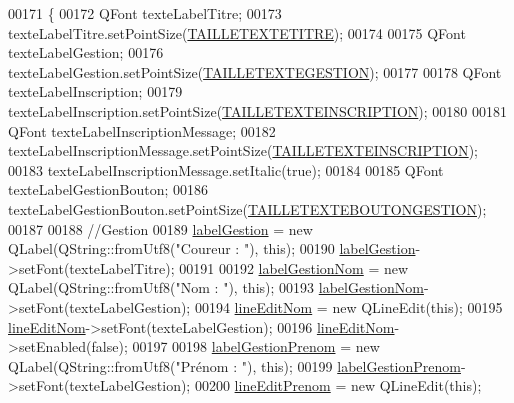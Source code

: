 \begin{DoxyCode}
00171 \{
00172     QFont texteLabelTitre;
00173     texteLabelTitre.setPointSize(\hyperlink{ihmgestioncross_8h_a36f0e5f0d9b4cfd8ae93abb3c8664bb8}{TAILLETEXTETITRE});
00174 
00175     QFont texteLabelGestion;
00176     texteLabelGestion.setPointSize(\hyperlink{ihmgestioncross_8h_a68398a635337dcf6f32e509fde02ae2e}{TAILLETEXTEGESTION});
00177 
00178     QFont texteLabelInscription;
00179     texteLabelInscription.setPointSize(\hyperlink{ihmgestioncross_8h_a03bd28b9d1b545df618f0ffa2bf27f03}{TAILLETEXTEINSCRIPTION});
00180 
00181     QFont texteLabelInscriptionMessage;
00182     texteLabelInscriptionMessage.setPointSize(\hyperlink{ihmgestioncross_8h_a03bd28b9d1b545df618f0ffa2bf27f03}{TAILLETEXTEINSCRIPTION});
00183     texteLabelInscriptionMessage.setItalic(\textcolor{keyword}{true});
00184 
00185     QFont texteLabelGestionBouton;
00186     texteLabelGestionBouton.setPointSize(\hyperlink{ihmgestioncross_8h_a098c492b1e1752f08ae7fc2dcd763840}{TAILLETEXTEBOUTONGESTION});
00187 
00188     \textcolor{comment}{//Gestion}
00189     \hyperlink{class_i_h_m_gestion_cross_abfb2504c2d5189d08e24677e04ddf3ba}{labelGestion} = \textcolor{keyword}{new} QLabel(QString::fromUtf8(\textcolor{stringliteral}{"Coureur : "}), \textcolor{keyword}{this});
00190     \hyperlink{class_i_h_m_gestion_cross_abfb2504c2d5189d08e24677e04ddf3ba}{labelGestion}->setFont(texteLabelTitre);
00191 
00192     \hyperlink{class_i_h_m_gestion_cross_a866a6f0ba317b299d4aede5fc276b2bb}{labelGestionNom} = \textcolor{keyword}{new} QLabel(QString::fromUtf8(\textcolor{stringliteral}{"Nom : "}), \textcolor{keyword}{this});
00193     \hyperlink{class_i_h_m_gestion_cross_a866a6f0ba317b299d4aede5fc276b2bb}{labelGestionNom}->setFont(texteLabelGestion);
00194     \hyperlink{class_i_h_m_gestion_cross_a633102626c5dedd575b51a1ba5c6e708}{lineEditNom} = \textcolor{keyword}{new} QLineEdit(\textcolor{keyword}{this});
00195     \hyperlink{class_i_h_m_gestion_cross_a633102626c5dedd575b51a1ba5c6e708}{lineEditNom}->setFont(texteLabelGestion);
00196     \hyperlink{class_i_h_m_gestion_cross_a633102626c5dedd575b51a1ba5c6e708}{lineEditNom}->setEnabled(\textcolor{keyword}{false});
00197 
00198     \hyperlink{class_i_h_m_gestion_cross_ae213fa44e6e291f9ca02d8b091ab0d06}{labelGestionPrenom} = \textcolor{keyword}{new} QLabel(QString::fromUtf8(\textcolor{stringliteral}{"Prénom : "}), \textcolor{keyword}{this});
00199     \hyperlink{class_i_h_m_gestion_cross_ae213fa44e6e291f9ca02d8b091ab0d06}{labelGestionPrenom}->setFont(texteLabelGestion);
00200     \hyperlink{class_i_h_m_gestion_cross_a7bea7529f01cf8ca8f365d418aae52d5}{lineEditPrenom} = \textcolor{keyword}{new} QLineEdit(\textcolor{keyword}{this});

\end{DoxyCode}
